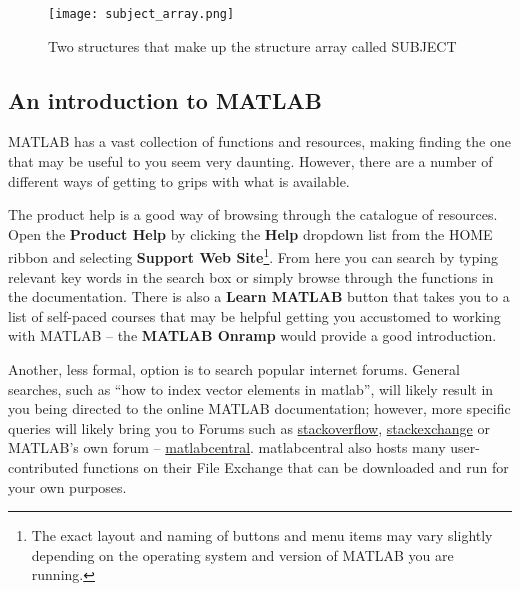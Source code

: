 \documentclass[12pt,a4paper]{article}
\begin{document}
{\begin{figure}[H]
\begin{center}
\texttt{[image: subject\_array.png]}
\caption{Two structures that make up the structure array called SUBJECT}
\label{fig:structurearray}
\end{center}
\end{figure}

\subsection{An introduction to MATLAB}
MATLAB has a vast collection of functions and resources, making finding the one that may be useful to you seem very daunting.  
However, there are a number of different ways of getting to grips with what is available.

The product help is a good way of browsing through the catalogue of resources.  
Open the \textbf{Product Help} by clicking the \textbf{Help} dropdown list from the HOME ribbon and selecting \textbf{Support Web Site}\footnote{The exact layout and naming of buttons and menu items may vary slightly depending on the operating system and version of MATLAB you are running.}.  
From here you can search by typing relevant key words in the search box or simply browse through the functions in the documentation.  
There is also a \textbf{Learn MATLAB} button that takes you to a list of self-paced courses that may be helpful getting you accustomed to working with MATLAB – the \textbf{MATLAB Onramp} would provide a good introduction.

Another, less formal, option is to search popular internet forums. 
General searches, such as ``how to index vector elements in matlab'', will likely result in you being directed to the online MATLAB documentation; however, more specific queries will likely bring you to Forums such as \href{https://stackoverflow.com/}{stackoverflow}, \href{https://stackexchange.com/}{stackexchange} or MATLAB's own forum – \href{https://au.mathworks.com/matlabcentral/}{matlabcentral}.
matlabcentral also hosts many user-contributed functions on their File Exchange that can be downloaded and run for your own purposes.


}
\end{document}
